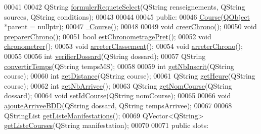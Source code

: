 \begin{DoxyCode}
00041 
00042     QString \hyperlink{class_course_a2ce9c62ead2c878a30af9d9c11b81644}{formulerRequeteSelect}(QString renseignements, QString sources, QString 
      conditions);
00043 
00044 
00045 \textcolor{keyword}{public}:
00046     \hyperlink{class_course_af6317ecab95f8a2eb205b4f91b530992}{Course}(\hyperlink{class_q_object}{QObject} *parent = \textcolor{keyword}{nullptr});
00047     \hyperlink{class_course_aa9038f2e129526920037dda9e76d69d0}{~Course}();
00048 
00049     \textcolor{keywordtype}{void} \hyperlink{class_course_a6eb96222d8dc1f352e28f36e9b414448}{creerChrono}();
00050     \textcolor{keywordtype}{void} \hyperlink{class_course_a50596f54553b48fa29170a6b42b6e9d4}{preparerChrono}();
00051     \textcolor{keywordtype}{bool} \hyperlink{class_course_a44a14d431bd64a507f2c2aa5f465b1b0}{estChronometragePret}();
00052     \textcolor{keywordtype}{void} \hyperlink{class_course_a589447dd63dca89395119ffd4e4a8c8c}{chronometrer}();
00053     \textcolor{keywordtype}{void} \hyperlink{class_course_a4426310a411d8ecf7f4a2dc64c24a42d}{arreterClassement}();
00054     \textcolor{keywordtype}{void} \hyperlink{class_course_a939635ac8301a7018475cc2ce347375f}{arreterChrono}();
00055 
00056     \textcolor{keywordtype}{int}  \hyperlink{class_course_a6cb3ede6a11e4813f95be92f4459a3c2}{verifierDossard}(QString dossard);
00057     QString \hyperlink{class_course_ab98bbd1a92e468df7b8b45bb7877afef}{convertirTemps}(QString tempsMS);
00058 
00059     \textcolor{keywordtype}{int} \hyperlink{class_course_ad0ff4153f1e02826d551f478f95ad260}{getNbInscrit}(QString course);
00060     \textcolor{keywordtype}{int} \hyperlink{class_course_af20fcd6d6eb2dfbd3b0f12e273f12b27}{getDistance}(QString course);
00061     QString \hyperlink{class_course_afc21f8195edd50c9fd266cff0c401b7c}{getHeure}(QString course);
00062     \textcolor{keywordtype}{int} \hyperlink{class_course_ad8dd87e7f299bc938f40423f28c837e8}{getNbArrivee}();
00063     QString \hyperlink{class_course_a7b4485a0b38bc3b908131962b705d880}{getNomCourse}(QString dossard);
00064     \textcolor{keywordtype}{void} \hyperlink{class_course_a36cf16c971841431947b6fbe2b3f3d27}{setIdCourse}(QString nomCourse);
00065 
00066     \textcolor{keywordtype}{void} \hyperlink{class_course_ac99042bf8b20e8d3a54e72c8a80f7ee7}{ajouteArriveeBDD}(QString dossard, QString tempsArrivee);
00067 
00068     QStringList \hyperlink{class_course_a0d995ef72152208e02eb3b10315dfabb}{getListeManifestations}();
00069     QVector<QString> \hyperlink{class_course_ae5e74946d973166ad3000e38600acf20}{getListeCourses}(QString manifestation);
00070 
00071 \textcolor{keyword}{public} slots:

\end{DoxyCode}
